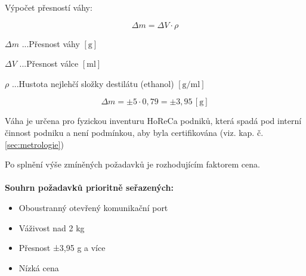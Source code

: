 Výpočet přesností váhy:


\begin{equation}
    \Delta m = \Delta V \cdot \rho \label{presnost vahy}
\end{equation}

\(\Delta m\) ...Přesnost váhy \([\mathrm{g}]\) %

\(\Delta V\) ...Přesnost válce \([\mathrm{ml}]\) %

\(\rho\) ...Hustota nejlehčí složky destilátu (ethanol) \([\mathrm{g/ml}]\)

\begin{equation}
    \Delta m = \pm5 \cdot 0,79 = \pm3,95 \, \left[\mathrm{g}\right] \label{presnost vahy}
\end{equation}



Váha je určena pro fyzickou inventuru HoReCa podniků, která spadá pod interní činnost podniku a není podmínkou, aby byla certifikována (viz. kap. č.\ref{sec:metrologie})

Po splnění výše zmíněných požadavků je rozhodujícím faktorem cena.
\\ \\
\textbf{Souhrn požadavků prioritně seřazených:} %
\begin{itemize}
    \item Oboustranný otevřený komunikační port
    \item Váživost nad 2 kg
    \item Přesnost ±3,95 g a více
    \item Nízká cena
\end{itemize}

